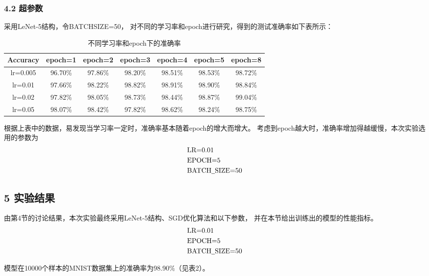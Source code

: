 \documentclass[a4paper,utf8]{article}
\begin{document}
	\subsubsection*{4.2 超参数}
	采用LeNet-5结构，令BATCH\underline{\hspace{0.5em}}SIZE=50，
	对不同的学习率和epoch进行研究，得到的测试准确率如下表所示：
	\begin{table}[h]
		\centering
		\label{tab:my_label}
		\begin{tabular}{|c|c|c|c|c|c|c|}
		   \hline
		   Accuracy & epoch=1 & epoch=2 & epoch=3 & epoch=4 & epoch=5 & epoch=8 \\
		   \hline
		   lr=0.005 & 96.70\% & 97.86\% & 98.20\% & 98.51\% & 98.53\% & 98.72\% \\
		   \hline
		   lr=0.01  & 97.66\% & 98.22\% & 98.82\% & 98.91\% & 98.90\% & 98.84\% \\
		   \hline
		   lr=0.02 & 97.82\% & 98.05\% & 98.73\% & 98.44\% & 98.87\% & 99.04\% \\
		   \hline
		   lr=0.05 & 98.07\% & 98.42\% & 97.82\% & 98.62\% & 98.24\% & 98.75\% \\
		   \hline
		\end{tabular}
		\caption{不同学习率和epoch下的准确率}
	\end{table}

	根据上表中的数据，易发现当学习率一定时，准确率基本随着epoch的增大而增大。
	考虑到epoch越大时，准确率增加得越缓慢，本次实验选用的参数为
	\begin{align*}
		& \text{LR=0.01} \\
		& \text{EPOCH=5} \\
		& \text{BATCH\underline{\hspace{0.5em}}SIZE=50}
	\end{align*}


	\subsection*{5 实验结果}
	由第4节的讨论结果，本次实验最终采用LeNet-5结构、SGD优化算法和以下参数，
	并在本节给出训练出的模型的性能指标。
	\begin{align*}
		& \text{LR=0.01} \\
		& \text{EPOCH=5} \\
		& \text{BATCH\underline{\hspace{0.5em}}SIZE=50}
	\end{align*}

	模型在10000个样本的MNIST数据集上的准确率为98.90\%（见表2）。
	
\end{document}
